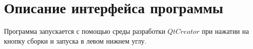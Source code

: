 %        
%
%
%
%
%
%
%
%

\section{Описание интерфейса программы}
Программа запускается с помощью среды разработки $Qt Creator$ при нажатии на кнопку сборки и запуска в левом нижнем углу.

